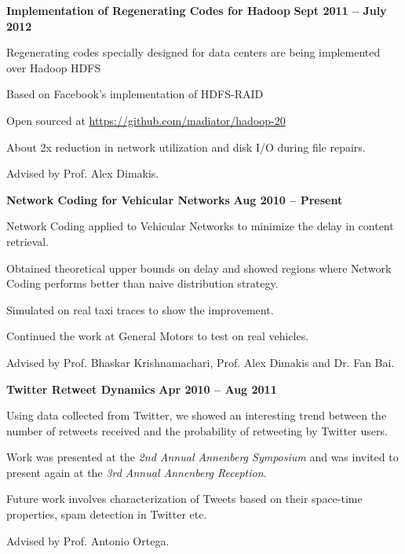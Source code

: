 \documentclass[margin,line]{resume}
\begin{document}
\begin{resume}
  \textbf{Implementation of Regenerating Codes for Hadoop} \hfill \textbf{Sept 2011 -- July 2012}
  \begin{list2}
   \item Regenerating codes specially designed for data centers are being implemented over Hadoop HDFS
   \item Based on Facebook's implementation of HDFS-RAID
   \item Open sourced at \href{https://github.com/madiator/hadoop-20}{https://github.com/madiator/hadoop-20}
   \item About 2x reduction in network utilization and disk I/O during file repairs.
   \item Advised by Prof. Alex Dimakis. 
  \end{list2}
  
  \textbf{Network Coding for Vehicular Networks} \hfill \textbf{Aug 2010 -- Present}
  \begin{list2}
   \item Network Coding applied to Vehicular Networks to minimize the delay in content retrieval. 
   \item Obtained theoretical upper bounds on delay and showed regions where Network Coding performs better than naive distribution strategy.
   \item Simulated on real taxi traces to show the improvement.
   \item Continued the work at General Motors to test on real vehicles. 
   \item Advised by Prof. Bhaskar Krishnamachari, Prof. Alex Dimakis and Dr. Fan Bai. 
  \end{list2}
  
  \textbf{Twitter Retweet Dynamics} \hfill \textbf{Apr 2010 -- Aug 2011}
  \begin{list2}
   \item Using data collected from Twitter, we showed an interesting trend between the number of retweets received and the probability of retweeting by Twitter users.
   \item Work was presented at the \textsl{2nd Annual Annenberg Symposium} and was invited to present again at the \textsl{3rd Annual Annenberg Reception}.
   \item Future work involves characterization of Tweets based on their space-time properties, spam detection in Twitter etc. 
   \item Advised by Prof. Antonio Ortega.
  \end{list2}
  


\end{resume}
\end{document}
